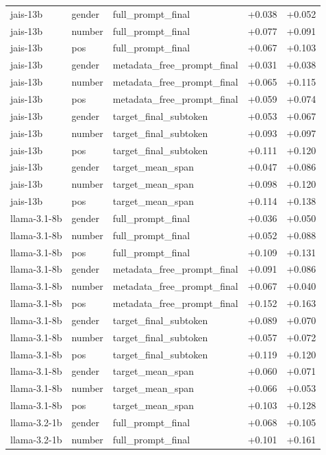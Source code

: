 \begin{tabular}{lllrr}
jais-13b & gender & full_prompt_final & +0.038 & +0.052 \\
jais-13b & number & full_prompt_final & +0.077 & +0.091 \\
jais-13b & pos & full_prompt_final & +0.067 & +0.103 \\
jais-13b & gender & metadata_free_prompt_final & +0.031 & +0.038 \\
jais-13b & number & metadata_free_prompt_final & +0.065 & +0.115 \\
jais-13b & pos & metadata_free_prompt_final & +0.059 & +0.074 \\
jais-13b & gender & target_final_subtoken & +0.053 & +0.067 \\
jais-13b & number & target_final_subtoken & +0.093 & +0.097 \\
jais-13b & pos & target_final_subtoken & +0.111 & +0.120 \\
jais-13b & gender & target_mean_span & +0.047 & +0.086 \\
jais-13b & number & target_mean_span & +0.098 & +0.120 \\
jais-13b & pos & target_mean_span & +0.114 & +0.138 \\
llama-3.1-8b & gender & full_prompt_final & +0.036 & +0.050 \\
llama-3.1-8b & number & full_prompt_final & +0.052 & +0.088 \\
llama-3.1-8b & pos & full_prompt_final & +0.109 & +0.131 \\
llama-3.1-8b & gender & metadata_free_prompt_final & +0.091 & +0.086 \\
llama-3.1-8b & number & metadata_free_prompt_final & +0.067 & +0.040 \\
llama-3.1-8b & pos & metadata_free_prompt_final & +0.152 & +0.163 \\
llama-3.1-8b & gender & target_final_subtoken & +0.089 & +0.070 \\
llama-3.1-8b & number & target_final_subtoken & +0.057 & +0.072 \\
llama-3.1-8b & pos & target_final_subtoken & +0.119 & +0.120 \\
llama-3.1-8b & gender & target_mean_span & +0.060 & +0.071 \\
llama-3.1-8b & number & target_mean_span & +0.066 & +0.053 \\
llama-3.1-8b & pos & target_mean_span & +0.103 & +0.128 \\
llama-3.2-1b & gender & full_prompt_final & +0.068 & +0.105 \\
llama-3.2-1b & number & full_prompt_final & +0.101 & +0.161 \\

\end{tabular}
